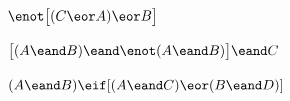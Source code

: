 \begin{compactlist}
\item $\enot\bigl[(C\eor A) \eor B\bigr]$\vspace{.5ex} 						
%
%
%

\item $\bigl[(A\eand B) \eand\enot(A\eand B)\bigr] \eand C$ \vspace{.5ex}	
%
%
%
%
%
\item $(A \eand B) \eif[(A \eand C) \eor (B \eand D)]$ \vspace{.5ex}		
%
%
%
\end{compactlist}

